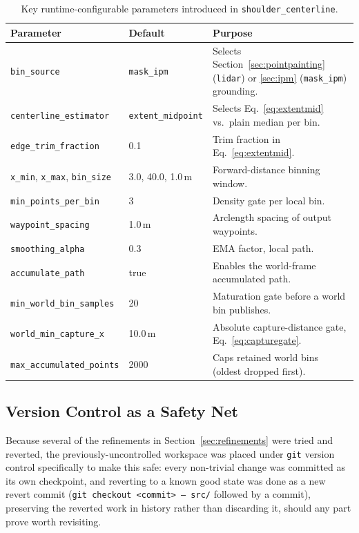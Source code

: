 \documentclass[11pt]{article}
\newcommand{\code}[1]{\texttt{#1}}
\begin{document}
\begin{table}[H]
\centering
\small
\begin{tabular}{@{}llp{7.7cm}@{}}
\toprule
\textbf{Parameter} & \textbf{Default} & \textbf{Purpose} \\
\midrule
\code{bin\_source} & \code{mask\_ipm} & Selects Section~\ref{sec:pointpainting} (\code{lidar}) or \ref{sec:ipm} (\code{mask\_ipm}) grounding. \\
\code{centerline\_estimator} & \code{extent\_midpoint} & Selects Eq.~\ref{eq:extentmid} vs.\ plain median per bin. \\
\code{edge\_trim\_fraction} & 0.1 & Trim fraction in Eq.~\ref{eq:extentmid}. \\
\code{x\_min}, \code{x\_max}, \code{bin\_size} & 3.0, 40.0, 1.0\,m & Forward-distance binning window. \\
\code{min\_points\_per\_bin} & 3 & Density gate per local bin. \\
\code{waypoint\_spacing} & 1.0\,m & Arclength spacing of output waypoints. \\
\code{smoothing\_alpha} & 0.3 & EMA factor, local path. \\
\code{accumulate\_path} & true & Enables the world-frame accumulated path. \\
\code{min\_world\_bin\_samples} & 20 & Maturation gate before a world bin publishes. \\
\code{world\_min\_capture\_x} & 10.0\,m & Absolute capture-distance gate, Eq.~\ref{eq:capturegate}. \\
\code{max\_accumulated\_points} & 2000 & Caps retained world bins (oldest dropped first). \\
\bottomrule
\end{tabular}
\caption{Key runtime-configurable parameters introduced in \code{shoulder\_centerline}.}
\label{tab:params}
\end{table}

\subsection{Version Control as a Safety Net}
Because several of the refinements in Section~\ref{sec:refinements} were tried and reverted, the
previously-uncontrolled workspace was placed under \code{git} version control specifically to make
this safe: every non-trivial change was committed as its own checkpoint, and reverting to a known
good state was done as a new revert commit (\code{git checkout \textless commit\textgreater{} --
src/} followed by a commit), preserving the reverted work in history rather than discarding it,
should any part prove worth revisiting.
\end{document}
